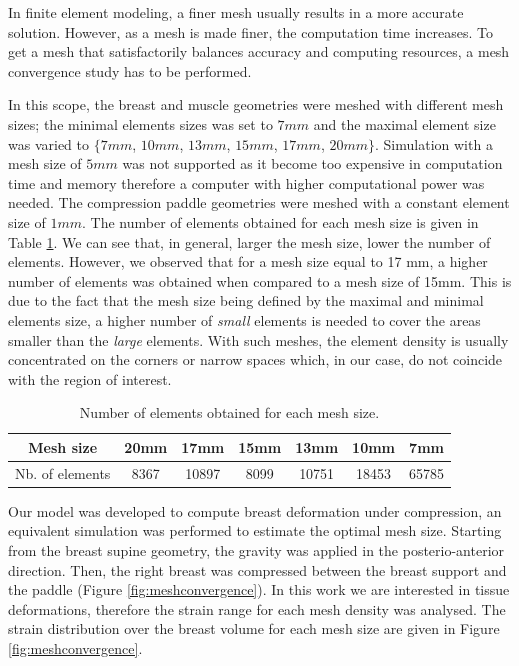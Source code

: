 In finite element modeling, a finer mesh usually results in a more accurate solution. However, as a mesh is made finer, the computation time increases. To get a mesh that satisfactorily balances accuracy and computing resources, a mesh convergence study has to be performed.

In this scope, the breast and muscle geometries were meshed with different mesh sizes; the minimal elements sizes was set to $7mm$ and the maximal element size was varied to $\lbrace 7mm$,  $10 mm$, $13mm$, $15mm$, $17mm$, $20mm\rbrace$. Simulation with a mesh size of $5mm$ was not supported as it become too expensive in computation time and memory therefore a computer with higher computational power was needed.  The compression paddle geometries were meshed with a constant element size of $1mm$. The number of elements obtained for each mesh size is given in Table  \ref{nbElementsvsmeshsize}. We can see that, in general, larger the mesh size, lower the number of elements. However, we observed that for a mesh size equal to 17 mm, a higher number of elements was obtained when compared to a mesh size of 15mm. This is due to the fact that the mesh size being defined by the maximal and minimal elements size, a higher number of \textit{small} elements is needed to cover the areas smaller than the \textit{large} elements. With such meshes, the element density is usually concentrated on the corners or narrow spaces which, in our case, do not coincide with the region of interest.  

\begin{table}[!h]
\begin{tabular}{|c|c|c|c|c|c|c|}
\hline
Mesh size & 20mm & 17mm & 15mm & 13mm & 10mm & 7mm \\
\hline
Nb. of elements & 8367 & 10897 & 8099 & 10751 & 18453 & 65785 \\
\hline
\end{tabular}
\caption{Number of elements obtained for each mesh size.}
\label{nbElementsvsmeshsize}
\end{table} 

Our model was developed to compute breast deformation under compression, an equivalent simulation was performed to estimate the optimal mesh size. Starting from the breast supine geometry, the gravity was applied in the posterio-anterior direction. Then, the right breast was compressed between the breast support and the paddle (Figure \ref{fig:meshconvergence}). In this work we are interested in tissue deformations, therefore the strain range for each mesh density was analysed. The strain distribution over the breast volume for each mesh size are given in Figure \ref{fig:meshconvergence}. 

